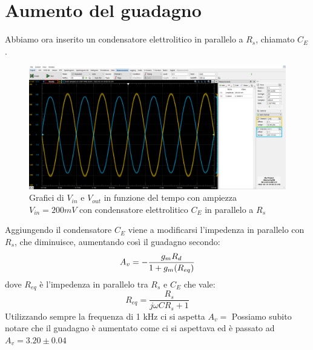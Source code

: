 \documentclass[10pt, a4paper, italian]{article}
\begin{document}
\section{Aumento del guadagno}
Abbiamo ora inserito un condensatore elettrolitico in parallelo a $R_s$, chiamato $C_E$.
\begin{figure}[H]
    \centering
	\includegraphics[scale=0.4]{amp.200.cap}
    \caption{Grafici di $V_{in}$ e $V_{out}$ in funzione del tempo con ampiezza $V_{in}=200 mV$ con condensatore elettrolitico $C_E$ in parallelo a $R_s$}
\end{figure}
Aggiungendo il condensatore $C_E$ viene a modificarsi l'impedenza in parallelo con $R_s$, che diminuisce, aumentando così il guadagno secondo:
\begin{equation}
A_v = -\frac{g_m R_d}{1+g_m (R_{eq})} \\
\end{equation}
dove $R_{eq}$ è l'impedenza in parallelo tra $R_s$ e $C_E$ che vale:
\begin{equation}
R_{eq} = \frac{R_s}{j\omega C R_s +1}
\end{equation}
Utilizzando sempre la frequenza di 1 kHz ci si aspetta $A_v =$
Possiamo subito notare che il guadagno è aumentato come ci si aspettava ed è passato ad $A_v =3.20 \pm 0.04$
\end{document}
